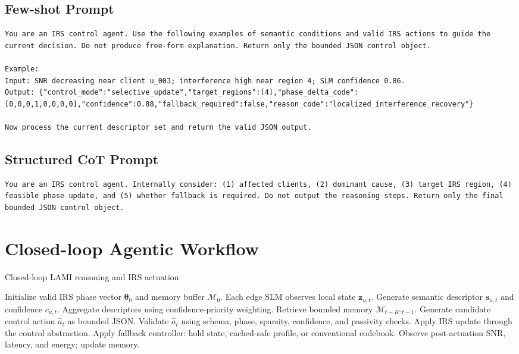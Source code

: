\documentclass[11pt]{article}
\begin{document}
\subsection{Few-shot Prompt}
\begin{lstlisting}
You are an IRS control agent. Use the following examples of semantic conditions and valid IRS actions to guide the current decision. Do not produce free-form explanation. Return only the bounded JSON control object.

Example:
Input: SNR decreasing near client u_003; interference high near region 4; SLM confidence 0.86.
Output: {"control_mode":"selective_update","target_regions":[4],"phase_delta_code":[0,0,0,1,0,0,0,0],"confidence":0.88,"fallback_required":false,"reason_code":"localized_interference_recovery"}

Now process the current descriptor set and return the valid JSON output.
\end{lstlisting}

\subsection{Structured CoT Prompt}
\begin{lstlisting}
You are an IRS control agent. Internally consider: (1) affected clients, (2) dominant cause, (3) target IRS region, (4) feasible phase update, and (5) whether fallback is required. Do not output the reasoning steps. Return only the final bounded JSON control object.
\end{lstlisting}

\section{Closed-loop Agentic Workflow}
\begin{algorithm}[h]
\caption{Closed-loop LAMI reasoning and IRS actuation}
\begin{algorithmic}[1]
\State Initialize valid IRS phase vector $\boldsymbol{\theta}_0$ and memory buffer $\mathcal{M}_0$.
    \State Each edge SLM observes local state $\mathbf{z}_{u,t}$.
    \State Generate semantic descriptor $\mathbf{s}_{u,t}$ and confidence $c_{u,t}$.
    \State Aggregate descriptors using confidence-priority weighting.
    \State Retrieve bounded memory $\mathcal{M}_{t-K:t-1}$.
    \State Generate candidate control action $\hat{a}_t$ as bounded JSON.
    \State Validate $\hat{a}_t$ using schema, phase, sparsity, confidence, and passivity checks.
        \State Apply IRS update through the control abstraction.
    \Else
        \State Apply fallback controller: hold state, cached-safe profile, or conventional codebook.
    \EndIf
    \State Observe post-actuation SNR, latency, and energy; update memory.
\EndFor
\end{algorithmic}
\end{algorithm}
\end{document}

